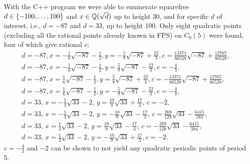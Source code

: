 With the C++ program we were able to enumerate squarefree $d \in
\left\{-100, \dots, 100\right\}$ and $x \in \mathbb{Q}(\sqrt{d})$ up to height 30, and
for specific $d$ of interest, i.e., $d = -87$ and $d = 33$,
up to height 100. Only eight quadratic points (excluding all the
rational points already known in FPS) on $C_0(5)$ were found, four of
which give rational $c$:
\[
\begin{gathered}
  d = -87,
  x = -\frac{1}{6} \sqrt{-87} - \frac{1}{2},
  y = -\frac{5}{9} \sqrt{-87} + \frac{22}{3},
  c = \frac{13371}{86528} \sqrt{-87} + \frac{12767}{86528},
  \\
  d = -87,
  x = -\frac{1}{6} \sqrt{-87} - \frac{1}{2},
  y = \frac{5}{9} \sqrt{-87} - \frac{22}{3},
  c = -\frac{4}{3},
  \\
  d = -87,
  x = \frac{1}{6} \sqrt{-87} - \frac{1}{2},
  y = \frac{5}{9} \sqrt{-87} + \frac{22}{3},
  c = -\frac{13371}{86528} \sqrt{-87} + \frac{12767}{86528},
  \\
  d = -87,
  x = \frac{1}{6} \sqrt{-87} - \frac{1}{2},
  y = -\frac{5}{9} \sqrt{-87} - \frac{22}{3},
  c = -\frac{4}{3},
  \\
  d = 33,\,
  x = -\frac{1}{3} \sqrt{33} - 2,\,
  y = \frac{10}{9} \sqrt{33} + \frac{17}{3},\,
  c = -2,
  \\
  d = 33,\,
  x = -\frac{1}{3} \sqrt{33} - 2,\,
  y = -\frac{10}{9} \sqrt{33} - \frac{17}{3},\,
  c = \frac{269}{128} \sqrt{33} - \frac{6415}{384},
  \\
  d = 33,\,
  x = \frac{1}{3} \sqrt{33} - 2,\,
  y = \frac{10}{9} \sqrt{33} - \frac{17}{3},\,
  c = -\frac{269}{128} \sqrt{33} - \frac{6415}{384},
  \\
  d = 33,\,
  x = \frac{1}{3} \sqrt{33} - 2,\,
  y = -\frac{10}{9} \sqrt{33} + \frac{17}{3},
  c = -2.
\end{gathered}
\]
$c = -\frac{4}{3}$ and $-2$ can be shown to not yield any quadratic
periodic points of period 5.

